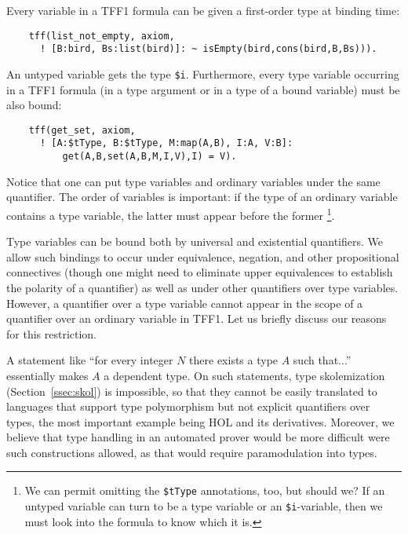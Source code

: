 Every variable in a TFF1 formula can be given a first-order type
at binding time:
\begin{verbatim}
    tff(list_not_empty, axiom,
      ! [B:bird, Bs:list(bird)]: ~ isEmpty(bird,cons(bird,B,Bs))).
\end{verbatim}
An untyped variable gets the type \verb+$i+.
Furthermore, every type variable occurring in a TFF1 formula
(in a type argument or in a type of a bound variable)
must be also bound:
\begin{verbatim}
    tff(get_set, axiom,
      ! [A:$tType, B:$tType, M:map(A,B), I:A, V:B]:
          get(A,B,set(A,B,M,I,V),I) = V).
\end{verbatim}
Notice that one can put type variables and ordinary variables
under the same quantifier. The order of variables is important:
if the type of an ordinary variable contains a type variable,
the latter must appear before the former%
\footnote{We can permit omitting the {\tt\$tType} annotations,
too, but should we? If an untyped variable can turn to be
a type variable or an {\tt\$i}-variable, then we must look
into the formula to know which it is.}.

Type variables can be bound both by universal and existential
quantifiers.
We allow such bindings to occur under equivalence, negation,
and other propositional connectives (though one might need
to eliminate upper equivalences to establish the polarity
of a quantifier) as well as under other quantifiers over
type variables.
However, a quantifier over a type variable cannot appear in
the scope of a quantifier over an ordinary variable in TFF1.
Let us briefly discuss our reasons for this restriction.

A statement like ``for every integer $N$ there exists a type
$A$ such that...'' essentially makes $A$ a dependent type.
On such statements, type skolemization (Section~\ref{ssec:skol})
is impossible, so that they cannot be easily translated to languages
that support type polymorphism but not explicit quantifiers over
types, the most important example being HOL and its derivatives.
Moreover, we believe that type handling in an automated prover
would be more difficult were such constructions allowed,
as that would require paramodulation into types.

